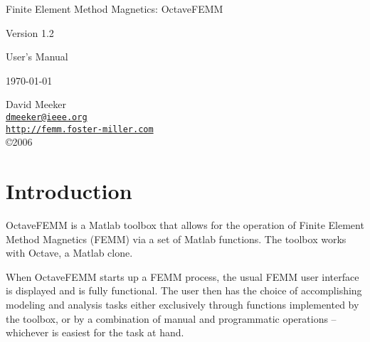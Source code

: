\documentclass[12pt]{article}
\begin{document}
\thispagestyle{empty}

\vspace*{2.5in}

\vspace*{0.5in}
\begin{center}
{\LARGE Finite Element Method Magnetics: OctaveFEMM}

\vspace*{16pt} {\Large Version 1.2}

\vspace*{16pt} {\Large User's Manual}

\vspace*{16pt} \today

\vspace*{48pt} David Meeker \\
\href{mailto:dmeeker@ieee.org}{\tt dmeeker@ieee.org} \\
\href{http://femm.foster-miller.com}{\tt http://femm.foster-miller.com} \\
\copyright 2006
\end{center}

\newpage


\section{Introduction}

OctaveFEMM is a Matlab toolbox that allows for the operation of Finite
Element Method Magnetics (FEMM) via a set of Matlab functions.  The toolbox
works with Octave, a Matlab clone.

When OctaveFEMM starts up a FEMM process, the usual FEMM user interface
is displayed and is fully functional.  The user then has the choice of
accomplishing modeling and analysis tasks either exclusively through
functions implemented by the toolbox, or by a combination of manual and
programmatic operations -- whichever is easiest for the task at hand.
\end{document}
